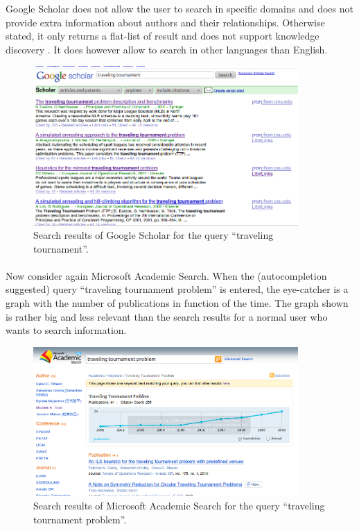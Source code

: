 \documentclass[12pt]{article}
\begin{document}
Google Scholar does not allow the user to search in specific domains and does not provide extra information about authors and their relationships. Otherwise stated, it only returns a flat-list of result and does not support knowledge discovery \cite{wang}. It does however allow to search in other languages than English.
\begin{figure}[hbpt]
 \centering
 \includegraphics[width=0.9\textwidth]{ttpscholar}
 \caption{Search results of Google Scholar for the query ``traveling tournament''.}
 \label{ttpscholar}
\end{figure}

\paragraph{}

Now consider again Microsoft Academic Search. When the (autocompletion suggested) query ``traveling tournament problem'' is entered, the eye-catcher is a graph with the number of publications in function of the time. The graph shown is rather big and less relevant than the search results for a normal user who wants to search information.
\begin{figure}[Hhbpt]
 \centering
 \includegraphics[width=0.9\textwidth]{ttproblem}
 \caption{Search results of Microsoft Academic Search for the query ``traveling tournament problem''.}
 \label{ttpproblem}
\end{figure}
\end{document}
